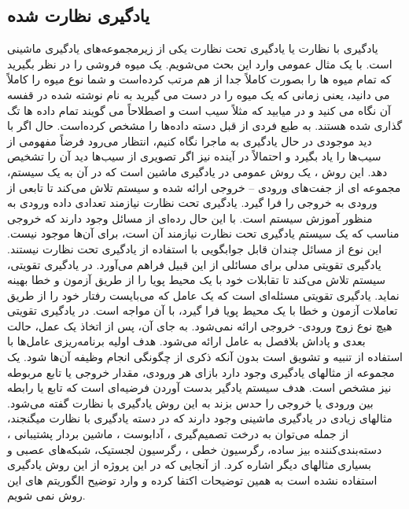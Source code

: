 \documentclass[conference]{IEEEtran}
\begin{document}
        \subsection{ یادگیری نظارت شده } 
یادگیری با نظارت یا یادگیری تحت نظارت یکی از زیرمجموعه‌های یادگیری ماشینی است. با یک مثال عمومی وارد این بحث می‌شویم. یک میوه فروشی را در نظر بگیرید که تمام میوه ها را بصورت کاملاً جدا از هم مرتب کرده‌است و شما نوع میوه را کاملاً می دانید، یعنی زمانی که یک میوه را در دست می گیرید به نام نوشته شده در قفسه آن نگاه می کنید و در میابید که مثلاً سیب است و اصطلاحاً می گویند تمام داده ها تگ گذاری شده هستند. به طبع فردی از قبل دسته داده‌ها را مشخص کرده‌است. حال اگر با دید موجودی در حال یادگیری به ماجرا نگاه کنیم، انتظار می‌رود فرضاً مفهومی از سیب‌ها را یاد بگیرد و احتمالاً در آینده نیز اگر تصویری از سیب‌ها دید آن را تشخیص دهد.
این روش ، یک روش عمومی در یادگیری ماشین است که در آن به یک سیستم، مجموعه ای از جفت‌های ورودی – خروجی ارائه شده و سیستم تلاش می‌کند تا تابعی از ورودی به خروجی را فرا گیرد. یادگیری تحت نظارت نیازمند تعدادی داده ورودی به منظور آموزش سیستم است. با این حال رده‌ای از مسائل وجود دارند که خروجی مناسب که یک سیستم یادگیری تحت نظارت نیازمند آن است، برای آن‌ها موجود نیست. این نوع از مسائل چندان قابل جوابگویی با استفاده از یادگیری تحت نظارت نیستند. یادگیری تقویتی   مدلی برای مسائلی از این قبیل فراهم می‌آورد. در یادگیری تقویتی، سیستم تلاش می‌کند تا تقابلات خود با یک محیط پویا را از طریق آزمون و خطا بهینه نماید. یادگیری تقویتی مسئله‌ای است که یک عامل که می‌بایست رفتار خود را از طریق تعاملات آزمون و خطا با یک محیط پویا فرا گیرد، با آن مواجه است. در یادگیری تقویتی هیچ نوع زوج ورودی- خروجی ارائه نمی‌شود. به جای آن، پس از اتخاذ یک عمل، حالت بعدی و پاداش بلافصل به عامل ارائه می‌شود. هدف اولیه برنامه‌ریزی عامل‌ها با استفاده از تنبیه و تشویق است بدون آنکه ذکری از چگونگی انجام وظیفه آن‌ها شود.
یک مجموعه از مثالهای یادگیری وجود دارد بازای هر ورودی، مقدار خروجی یا تابع مربوطه نیز مشخص است. هدف سیستم یادگیر بدست آوردن فرضیه‌ای است که تابع یا رابطه بین ورودی یا خروجی را حدس بزند به این روش یادگیری با نظارت گفته می‌شود. مثالهای زیادی در یادگیری ماشینی وجود دارند که در دسته یادگیری با نظارت میگنجند، از جمله می‌توان به درخت تصمیم‌گیری ، آدابوست ، ماشین بردار پشتیبانی ، دسته‌بندی‌کننده بیز ساده، رگرسیون خطی ، رگرسیون لجستیک، شبکه‌های عصبی و بسیاری مثالهای دیگر اشاره کرد.
از آنجایی که در این پروژه از این روش یادگیری استفاده نشده است به همین توضیحات اکتفا کرده و وارد توضیح الگوریتم های این روش نمی شویم.
\end{document}
